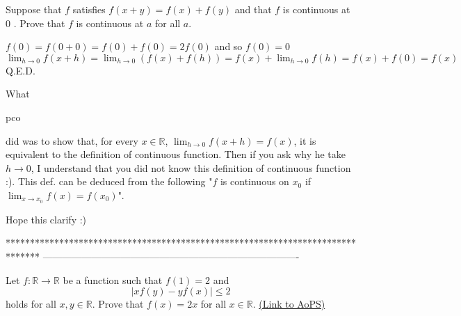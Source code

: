 \begin{solution}
	\begin{tcolorbox}Suppose that $f $ satisfies $f(x+y)=f(x)+f(y) $ and that $f $ is continuous at $0 $ . Prove that $f $ is continuous at $a $ for all $a $.\end{tcolorbox}
$f(0)=f(0+0)=f(0)+f(0)=2f(0)$ and so $f(0)=0$
$\lim_{h\to 0}f(x+h)=\lim_{h\to 0}(f(x)+f(h))=f(x)+\lim_{h\to 0}f(h)=f(x)+f(0)=f(x)$
Q.E.D.
\end{solution}






\begin{solution}
	What \begin{bolded}pco \end{bolded}did was to show that, for every $x\in\mathbb{R}$, $\lim_{h\to 0}f(x+h)=f(x)$, it is equivalent to the definition of continuous function. Then if you ask why he take $h\to 0$, I understand that you did not know this definition of continuous function :). This def.  can be deduced from the following "$f$ is continuous on $x_0$ if $\lim_{x\to x_0}f(x)=f(x_0)$".

Hope this clarify :)
\end{solution}
*******************************************************************************
-------------------------------------------------------------------------------

\begin{problem}
	Let $f:\mathbb R \to \mathbb R$ be a function such that $f(1)=2$ and \[\left|xf(y)-yf(x) \right|\leq 2\] holds for all $x,y \in \mathbb{R}$. Prove that $f(x)=2x$ for all $x\in \mathbb{R}$.
	\flushright \href{https://artofproblemsolving.com/community/c6h440327}{(Link to AoPS)}
\end{problem}



